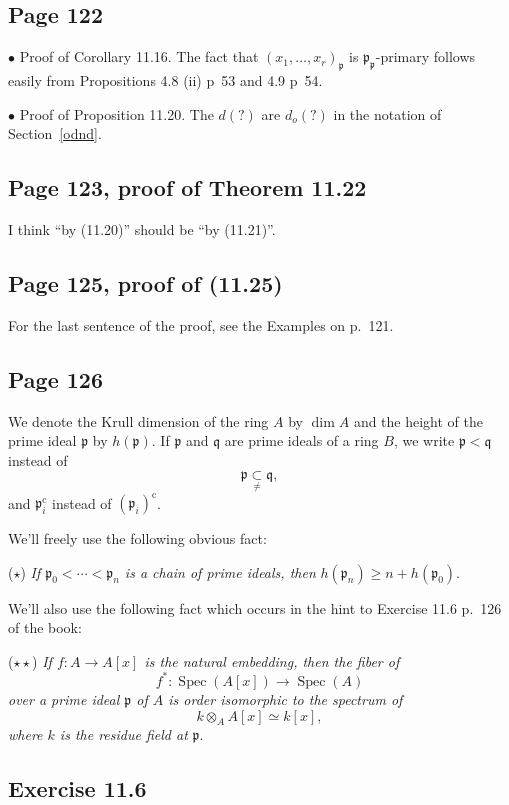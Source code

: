 \documentclass[parskip=half,fontsize=12pt]{scrartcl}%
\newcommand{\oo}{\operatorname}\newcommand{\ooo}{\operatorname*}
\newcommand{\mf}{\mathfrak}
\newcommand{\ppp}{\mf p}
\newcommand{\bu}{\bullet}
\begin{document}
\subsection{Page 122}%

$\bu$ Proof of Corollary 11.16. The fact that $(x_1,\dots,x_r)_\ppp$ is $\ppp_\ppp$-primary follows easily from Propositions 4.8 (ii) p~53 and 4.9 p~54.

$\bu$ Proof of Proposition 11.20. The $d(?)$ are $d_o(?)$ in the notation of Section~\ref{odnd}.

\subsection{Page 123, proof of Theorem 11.22}%

I think ``by (11.20)'' should be ``by (11.21)''.

\subsection{Page 125, proof of (11.25)}%

For the last sentence of the proof, see the Examples on p.~121.

\subsection{Page 126}%

We denote the Krull dimension of the ring $A$ by $\dim A$ and the height of the prime ideal $\ppp$ by $h(\ppp)$. If $\ppp$ and $\mf q$ are prime ideals of a ring $B$, we write $\ppp<\mf q$ instead of 
$$
\ppp\underset\ne\subset\mf q,
$$ 
and $\ppp_i^{\oo c}$ instead of $(\ppp_i)^{\oo c}$. 

We'll freely use the following obvious fact:

($\star$) \emph{If $\ppp_0<\cdots<\ppp_n$ is a chain of prime ideals, then} $h(\ppp_n)\ge n+h(\ppp_0)$. 

We'll also use the following fact which occurs in the hint to Exercise 11.6 p.~126 of the book:

($\star\star$) \emph{If $f:A\to A[x]$ is the natural embedding, then the fiber of} 
$$
f^*:\oo{Spec}(A[x])\to\oo{Spec}(A)
$$ 
\emph{over a prime ideal $\ppp$ of $A$ is order isomorphic to the spectrum of} 
$$
k\otimes_AA[x]\simeq k[x],
$$ 
\emph{where $k$ is the residue field at} $\ppp$.

\subsection{Exercise 11.6}%
\end{document}
